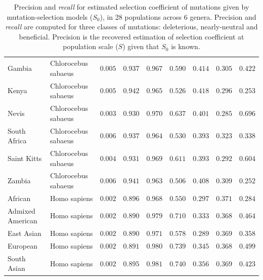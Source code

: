 \documentclass{article}
\newcommand{\Sphy}{S_{0}}
\newcommand{\Spop}{S}
\begin{document}
\begin{table}[tb]
\begin{adjustbox}{width=\textwidth}
\begin{tabular}{||l|l|r||r|r||r|r||r|r||}
                \rowcolor{LIGHTGREY} Gambia               & Chlorocebus sabaeus & $ 0.005$ & $ 0.937$ & $ 0.967$ & $ 0.590$ & $ 0.414$ & $ 0.305$ & $ 0.422$ \\
                \rowcolor{LIGHTGREY} Kenya              & Chlorocebus sabaeus        & $ 0.005$ & $ 0.942$ & $ 0.965$ & $ 0.526$ & $ 0.418$ & $ 0.296$ & $ 0.253$ \\
                \rowcolor{LIGHTGREY} Nevis     & Chlorocebus sabaeus        & $ 0.003$ & $ 0.930$ & $ 0.970$ & $ 0.637$ & $ 0.401$ & $ 0.285$ & $ 0.696$ \\
                \rowcolor{LIGHTGREY} South Africa           & Chlorocebus sabaeus        & $ 0.006$ & $ 0.937$ & $ 0.964$ & $ 0.530$ & $ 0.393$ & $ 0.323$ & $ 0.338$ \\
                \rowcolor{LIGHTGREY} Saint Kitts             & Chlorocebus sabaeus        & $ 0.004$ & $ 0.931$ & $ 0.969$ & $ 0.611$ & $ 0.393$ & $ 0.292$ & $ 0.604$ \\
                \rowcolor{LIGHTGREY} Zambia          & Chlorocebus sabaeus        & $ 0.006$ & $ 0.941$ & $ 0.963$ & $ 0.506$ & $ 0.408$ & $ 0.309$ & $ 0.252$ \\
                African          & Homo sapiens        & $ 0.002$ & $ 0.896$ & $ 0.968$ & $ 0.550$ & $ 0.297$ & $ 0.371$ & $ 0.284$ \\
                Admixed American          & Homo sapiens        & $ 0.002$ & $ 0.890$ & $ 0.979$ & $ 0.710$ & $ 0.333$ & $ 0.368$ & $ 0.464$ \\
                East Asian          & Homo sapiens        & $ 0.002$ & $ 0.890$ & $ 0.971$ & $ 0.578$ & $ 0.289$ & $ 0.369$ & $ 0.358$ \\
                European          & Homo sapiens        & $ 0.002$ & $ 0.891$ & $ 0.980$ & $ 0.739$ & $ 0.345$ & $ 0.368$ & $ 0.499$ \\
                South Asian          & Homo sapiens        & $ 0.002$ & $ 0.895$ & $ 0.981$ & $ 0.740$ & $ 0.356$ & $ 0.369$ & $ 0.423$ \\
                \bottomrule
            \end{tabular}
        \end{adjustbox}
        \caption{
            Precision and \textit{recall} for estimated selection coefficient of mutations given by mutation-selection models ($\Sphy$), in 28 populations across 6 genera.
            Precision and \textit{recall} are computed for three classes of mutations: deleterious, nearly-neutral and beneficial.
            Precision is the recovered estimation of selection coefficient at population scale ($\Spop$) given that $\Sphy$ is known.
}
\end{table}
\end{document}
